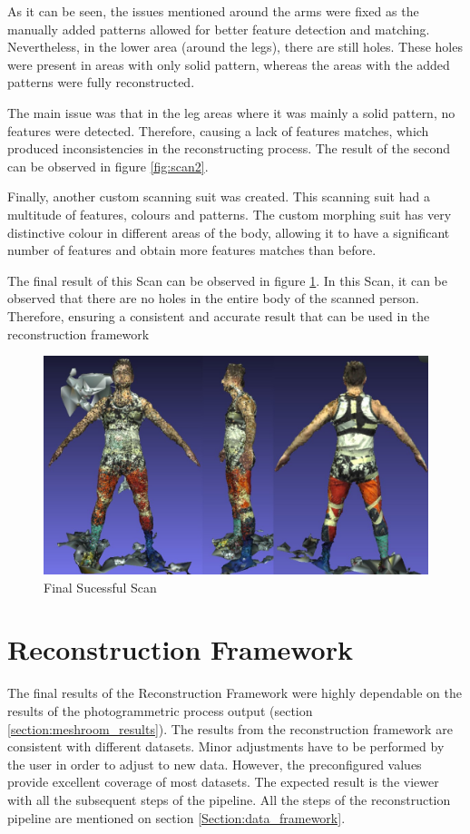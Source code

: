 \documentclass[12pt]{report}
\begin{document}
As it can be seen, the issues mentioned around the arms were fixed as the manually added patterns allowed for better feature detection and matching.
Nevertheless, in the lower area (around the legs), there are still holes. These holes were present in areas with only solid pattern, whereas the areas with the added patterns were fully reconstructed.
 
The main issue was that in the leg areas where it was mainly a solid pattern, no features were detected. Therefore, causing a lack of features matches, which produced inconsistencies in the reconstructing process. 
The result of the second can be observed in figure \ref{fig:scan2}.

Finally, another custom scanning suit was created. This scanning suit had a multitude of features, colours and patterns. 
The custom morphing suit has very distinctive colour in different areas of the body, allowing it to have a significant number of features and obtain more features matches than before.

The final result of this Scan can be observed in figure \ref{fig:scan3}. In this Scan, it can be observed that there are no holes in the entire body of the scanned person. 
Therefore, ensuring a consistent and accurate result that can be used in the reconstruction framework
 
\begin{figure}[H]%
  \centering
 \includegraphics[width=1\textwidth]{scan3.png}
\caption{Final Sucessful Scan}
\label{fig:scan3} 
\end{figure}








\newpage
\section{Reconstruction Framework}
The final results of the Reconstruction Framework were highly dependable on the results of the photogrammetric process output (section \ref{section:meshroom_results}). 
The results from the reconstruction framework are consistent with different datasets. Minor adjustments have to be performed by the user in order to adjust to new data. 
However, the preconfigured values provide excellent coverage of most datasets. 
The expected result is the viewer with all the subsequent steps of the pipeline. All the steps of the reconstruction pipeline are mentioned on section \ref{Section:data_framework}.
\end{document}
